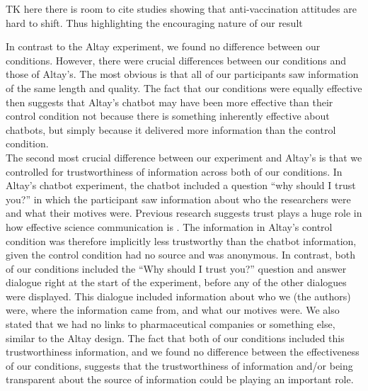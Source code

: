 \documentclass[english,,jou,floatsintext]{apa6}
\begin{document}
TK here there is room to cite studies showing that anti-vaccination attitudes are hard to shift. Thus highlighting the encouraging nature of our result

In contrast to the Altay experiment, we found no difference between our conditions. However, there were crucial differences between our conditions and those of Altay's. The most obvious is that all of our participants saw information of the same length and quality. The fact that our conditions were equally effective then suggests that Altay's chatbot may have been more effective than their control condition not because there is something inherently effective about chatbots, but simply because it delivered more information than the control condition.\\
The second most crucial difference between our experiment and Altay's is that we controlled for trustworthiness of information across both of our conditions. In Altay's chatbot experiment, the chatbot included a question \enquote{why should I trust you?} in which the participant saw information about who the researchers were and what their motives were. Previous research suggests trust plays a huge role in how effective science communication is . The information in Altay's control condition was therefore implicitly less trustworthy than the chatbot information, given the control condition had no source and was anonymous. In contrast, both of our conditions included the \enquote{Why should I trust you?} question and answer dialogue right at the start of the experiment, before any of the other dialogues were displayed. This dialogue included information about who we (the authors) were, where the information came from, and what our motives were. We also stated that we had no links to pharmaceutical companies or something else, similar to the Altay design. The fact that both of our conditions included this trustworthiness information, and we found no difference between the effectiveness of our conditions, suggests that the trustworthiness of information and/or being transparent about the source of information could be playing an important role.
\end{document}
